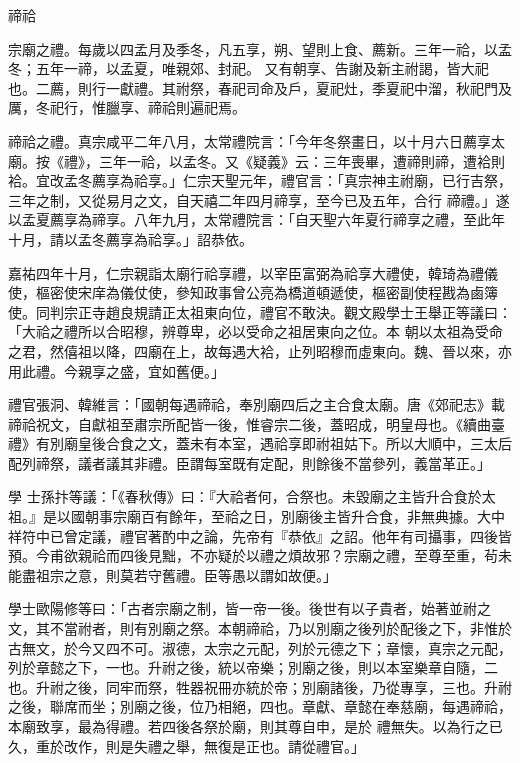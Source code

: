 
\begin{pinyinscope}

 禘祫



 宗廟之禮。每歲以四孟月及季冬，凡五享，朔、望則上食、薦新。三年一祫，以孟冬；五年一禘，以孟夏，唯親郊、封祀。
 又有朝享、告謝及新主祔謁，皆大祀也。二薦，則行一獻禮。其祔祭，春祀司命及戶，夏祀灶，季夏祀中溜，秋祀門及厲，冬祀行，惟臘享、禘祫則遍祀焉。



 禘祫之禮。真宗咸平二年八月，太常禮院言：「今年冬祭畫日，以十月六日薦享太廟。按《禮》，三年一祫，以孟冬。又《疑義》云：三年喪畢，遭禘則禘，遭袷則袷。宜改孟冬薦享為祫享。」仁宗天聖元年，禮官言：「真宗神主祔廟，已行吉祭，三年之制，又從易月之文，自天禧二年四月禘享，至今已及五年，合行
 禘禮。」遂以孟夏薦享為禘享。八年九月，太常禮院言：「自天聖六年夏行禘享之禮，至此年十月，請以孟冬薦享為祫享。」詔恭依。



 嘉祐四年十月，仁宗親詣太廟行祫享禮，以宰臣富弼為祫享大禮使，韓琦為禮儀使，樞密使宋庠為儀仗使，參知政事曾公亮為橋道頓遞使，樞密副使程戡為鹵簿使。同判宗正寺趙良規請正太祖東向位，禮官不敢決。觀文殿學士王舉正等議曰：「大祫之禮所以合昭穆，辨尊卑，必以受命之祖居東向之位。本
 朝以太祖為受命之君，然僖祖以降，四廟在上，故每遇大袷，止列昭穆而虛東向。魏、晉以來，亦用此禮。今親享之盛，宜如舊便。」



 禮官張洞、韓維言：「國朝每遇禘祫，奉別廟四后之主合食太廟。唐《郊祀志》載禘祫祝文，自獻祖至肅宗所配皆一後，惟睿宗二後，蓋昭成，明皇母也。《續曲臺禮》有別廟皇後合食之文，蓋未有本室，遇祫享即祔祖姑下。所以大順中，三太后配列禘祭，議者議其非禮。臣謂每室既有定配，則餘後不當參列，義當革正。」



 學
 士孫抃等議：「《春秋傳》曰：『大祫者何，合祭也。未毀廟之主皆升合食於太祖。』是以國朝事宗廟百有餘年，至祫之日，別廟後主皆升合食，非無典據。大中祥符中已曾定議，禮官著酌中之論，先帝有『恭依』之詔。他年有司攝事，四後皆預。今甫欲親祫而四後見黜，不亦疑於以禮之煩故邪？宗廟之禮，至尊至重，茍未能盡祖宗之意，則莫若守舊禮。臣等愚以謂如故便。」



 學士歐陽修等曰：「古者宗廟之制，皆一帝一後。後世有以子貴者，始著並祔之
 文，其不當祔者，則有別廟之祭。本朝禘祫，乃以別廟之後列於配後之下，非惟於古無文，於今又四不可。淑德，太宗之元配，列於元德之下；章懷，真宗之元配，列於章懿之下，一也。升祔之後，統以帝樂；別廟之後，則以本室樂章自隨，二也。升祔之後，同牢而祭，牲器祝冊亦統於帝；別廟諸後，乃從專享，三也。升祔之後，聯席而坐；別廟之後，位乃相絕，四也。章獻、章懿在奉慈廟，每遇禘祫，本廟致享，最為得禮。若四後各祭於廟，則其尊自申，是於
 禮無失。以為行之已久，重於改作，則是失禮之舉，無復是正也。請從禮官。」




\end{pinyinscope}
